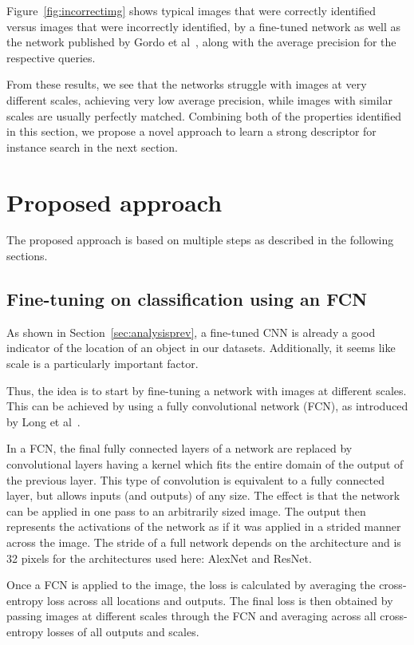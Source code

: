 Figure~\ref{fig:incorrectimg}
shows typical images that were correctly identified versus images that
were incorrectly identified, by a fine-tuned network as well as the network
published by Gordo et al~\cite{gordo_deep_2016}, along with the average
precision for the respective queries.

From these results, we see that the networks struggle with images at
very different scales, achieving very low average precision,
while images with similar scales are usually perfectly matched.
Combining both of the properties identified in this section, we
propose a novel approach to learn a strong descriptor for instance
search in the next section.

\section{Proposed approach}
The proposed approach is based on multiple steps as described in the
following sections.

\subsection{Fine-tuning on classification using an FCN}\label{sec:fcnfinetune}
As shown in Section~\ref{sec:analysisprev}, a fine-tuned CNN is already
a good indicator of the location of an object in our datasets.
Additionally, it seems like scale is a particularly important factor.

Thus, the idea is to start by fine-tuning a network with images
at different scales. This can be achieved by using a fully
convolutional network (FCN), as introduced by
Long et al~\cite{long_fully_2015}.

In a FCN, the final fully connected layers
of a network are replaced by convolutional layers having a kernel
which fits the entire domain of the output of the previous layer.
This type of convolution is equivalent to a fully connected layer,
but allows inputs (and outputs) of any size.
The effect is that the network can be applied in one pass to an
arbitrarily sized image. The output then represents the activations
of the network as if it was applied in a strided manner across the image.
The stride of a full network depends on the architecture and is 32
pixels for the architectures used here: AlexNet and ResNet.

Once a FCN is applied to the image, the loss
is calculated by averaging the cross-entropy loss across all locations
and outputs.
The final loss is then obtained by passing images at different scales
through the FCN and averaging across all cross-entropy losses of all
outputs and scales.

